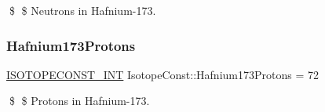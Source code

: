 \$ \$ Neutrons in Hafnium-\/173. \mbox{\label{group___isotope_const-_hafnium-_hf173_ga02030f0f777e3665d709e06791560789}} 
\subsubsection{\texorpdfstring{Hafnium173\+Protons}{Hafnium173Protons}}
{\footnotesize\ttfamily \mbox{\hyperlink{group___isotope_const-_macros_ga5f18360b3e99483a35c32d789e62621c}{I\+S\+O\+T\+O\+P\+E\+C\+O\+N\+S\+T\+\_\+\+I\+NT}} Isotope\+Const\+::\+Hafnium173\+Protons = 72}

\$ \$ Protons in Hafnium-\/173. 
